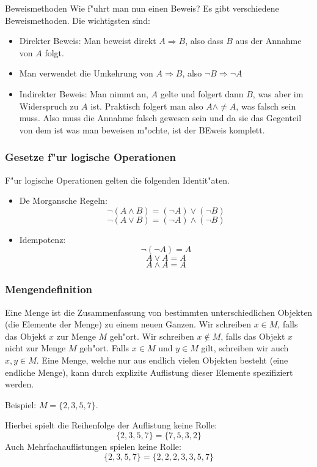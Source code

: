 \documentclass{beamer}
\begin{document}
\begin{frame}{Beweismethoden}
  Wie f"uhrt man nun einen Beweis? Es gibt verschiedene Beweismethoden. Die wichtigsten sind:
  \begin{itemize}
    \item Direkter Beweis: Man beweist direkt $A\Rightarrow B$, also dass $B$ aus der Annahme von $A$ folgt.
    \item Man verwendet die Umkehrung von $A\Rightarrow B$, also $\neg B\Rightarrow\neg A$
    \item Indirekter Beweis: Man nimmt an, $A$ gelte und folgert dann $B$, was aber im Widerspruch zu $A$ ist. Praktisch folgert man also $A\wedge\neq A$, was falsch sein muss. Also muss die Annahme falsch gewesen sein und da sie das Gegenteil von dem ist was man beweisen m"ochte, ist der BEweis komplett.
  \end{itemize}
  
\end{frame}

\begin{frame}
  \frametitle{Gesetze f"ur logische Operationen}
  F"ur logische Operationen gelten die folgenden Identit"aten. 
  \begin{itemize}
    \item De Morgansche Regeln: \[\neg(A\wedge B) = (\neg A)\vee(\neg B)\]\[\neg(A\vee B) = (\neg A)\wedge(\neg B)\]
    \item Idempotenz: \[\neg(\neg A) = A\]\[A\vee A = A\]\[A\wedge A = A\]
  \end{itemize}
   
\end{frame}

\begin{frame}
  \frametitle{Mengendefinition}
  \begin{definition}
    Eine Menge ist die Zusammenfassung von bestimmten unterschiedlichen
    Objekten (die Elemente der Menge) zu einem neuen Ganzen.
    Wir schreiben $x\in M$, falls das Objekt $x$ zur Menge $M$ geh"ort.
    Wir schreiben $x\notin M$, falls das Objekt $x$ nicht zur Menge $M$ geh"ort.
    Falls $x\in M$ und $y\in M$ gilt, schreiben wir auch $x, y \in M$.
    Eine Menge, welche nur aus endlich vielen Objekten besteht (eine endliche
    Menge), kann durch explizite Auflistung dieser Elemente spezifiziert
    werden.
  \end{definition}
    Beispiel: $M=\{2,3,5,7\}$.

    Hierbei spielt die Reihenfolge der Auflistung keine Rolle:
    \[\{2,3,5,7\}=\{7,5,3,2\}\]
    Auch Mehrfachauflistungen spielen keine Rolle:
    \[\{2,3,5,7\}=\{2,2,2,3,3,5,7\}\]
  \end{frame}
\end{document}
